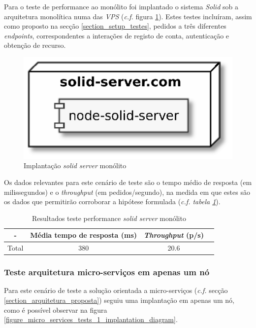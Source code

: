 Para o teste de performance ao monólito foi implantado o sistema \emph{Solid} sob a arquitetura monolítica numa das \emph{\acrshort{VPS}} (\emph{c.f.} figura \ref{monolith_tests_implantation_diagram}). Estes testes incluíram, assim como proposto na secção \ref{section_setup_testes}, pedidos a três diferentes \emph{endpoints}, correspondentes a interações de registo de conta, autenticação e obtenção de recurso.

\begin{figure}[H]
    \begin{center}
    \includegraphics[width=0.3 \textwidth]{figures/monolith_tests.eps}
    \caption{Implantação \emph{solid server} monólito}
    \label{monolith_tests_implantation_diagram}
    \end{center}
\end{figure}

Os dados relevantes para este cenário de teste são o tempo médio de resposta (em milissegundos) e o \emph{throughput} (em pedidos/segundo), na medida em que estes são os dados que permitirão corroborar a hipótese formulada (\emph{c.f. tabela \ref{table_resultados_testes_performance_monolith}}).

\begin{table}[h]
\centering

\caption{Resultados teste performance \emph{solid server} monólito}
\label{table_resultados_testes_performance_monolith}
\vspace{0.5cm}
\begin{tabular}{c|c|c|c}
 - & Média tempo de resposta (ms) & \emph{Throughput} (p/s) \\
\hline                          
Total & 380 & 20.6 \\
\end{tabular}
\end{table}

\subsubsection*{Teste arquitetura micro-serviços em apenas um nó \label{tests_micro_services_1}}

Para este cenário de teste a solução orientada a micro-serviços (\emph{c.f.} secção  \ref{section_arquitetura_proposta}) seguiu uma implantação em apenas um nó, como é possível observar na figura \ref{figure_micro_services_tests_1_implantation_diagram}.

